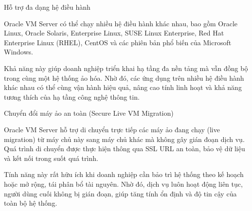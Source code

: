 \begin{myitem}
\item Hỗ trợ đa dạng hệ điều hành

\hspace*{1cm} Oracle VM Server có thể chạy nhiều hệ điều hành khác nhau, bao gồm Oracle Linux, Oracle Solaris, Enterprise Linux, SUSE Linux Enterprise, Red Hat Enterprise Linux (RHEL), CentOS và các phiên bản phổ biến của Microsoft Windows.

\hspace*{1cm} Khả năng này giúp doanh nghiệp triển khai hạ tầng đa nền tảng mà vẫn đồng bộ trong cùng một hệ thống ảo hóa. Nhờ đó, các ứng dụng trên nhiều hệ điều hành khác nhau có thể cùng vận hành hiệu quả, nâng cao tính linh hoạt và khả năng tương thích của hạ tầng công nghệ thông tin.

\item Chuyển đổi máy ảo an toàn (Secure Live VM Migration)

\hspace*{1cm}Oracle VM Server hỗ trợ di chuyển trực tiếp các máy ảo đang chạy (live migration) từ máy chủ này sang máy chủ khác mà không gây gián đoạn dịch vụ. Quá trình di chuyển được thực hiện thông qua SSL URL an toàn, bảo vệ dữ liệu và kết nối trong suốt quá trình.

\hspace*{1cm} Tính năng này rất hữu ích khi doanh nghiệp cần bảo trì hệ thống theo kế hoạch hoặc mở rộng, tái phân bổ tài nguyên. Nhờ đó, dịch vụ luôn hoạt động liên tục, người dùng cuối không bị gián đoạn, giúp tăng tính ổn định và độ tin cậy của toàn bộ hệ thống.
\end{myitem}


